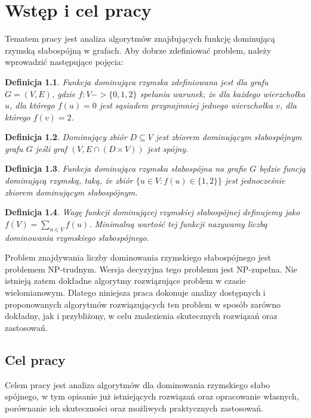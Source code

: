 \chapter{Wstęp i cel pracy}
Tematem pracy jest analiza algorytmów znajdujących funkcję dominującą rzymską słabospójną w grafach. Aby dobrze zdefiniować problem, należy wprowadzić następujące pojęcia:

\newtheorem{definition}{Definicja}

\begin{definition}
    Funkcja dominująca rzymska zdefiniowana jest dla grafu $G = (V, E)$, gdzie $f: V -> \{0,1,2\}$ spełania warunek, że dla każdego wierzchołka $u$, dla którego $f(u) = 0$ jest sąsiadem przynajmniej jednego wierzchołka $v$, dla którego $f(v) = 2$.
\end{definition}

\begin{definition}
    Dominujący zbiór $D \subseteq V$ jest zbiorem dominującym słabospójnym grafu $G$ jeśli graf $(V,E \cap (D \times V))$ jest spójny.
\end{definition}

\begin{definition}
    Funkcja dominująca rzymska słabospójna na grafie $G$ będzie funcją dominującą rzymską, taką, że zbiór $\{u \in V: f(u) \in \{1,2\}\}$ jest jednocześnie zbiorem dominującym słabospójnym.
\end{definition}

\begin{definition}
    Wagę funkcji dominującej rzymskiej słabospójnej definujemy jako $f(V) = \sum_{u \in V}{f(u)}$. Minimalną wartość tej funkcji nazywamy liczbą dominowania rzymskiego słabospójnego. 
\end{definition}

Problem znajdywania liczby dominowania rzymskiego słabospójnego jest problemem NP-trudnym. Wersja decyzyjna tego problemu jest NP-zupełna. Nie istnieją zatem dokładne algorytmy rozwiązujące problem w czasie wielomianowym. Dlatego niniejsza praca dokonuje analizy dostępnych i proponowanych algorytmów rozwiązujących ten problem w sposób zarówno dokładny, jak i przybliżony, w celu znalezienia skutecznych rozwiązań oraz zastosowań.

\section{Cel pracy}
Celem pracy jest analiza algorytmów dla dominowania rzymskiego słabo spójnego, w tym opisanie już istniejących rozwiązań oraz opracowanie własnych, porównanie ich skuteczności oraz możliwych praktycznych zastosowań.

